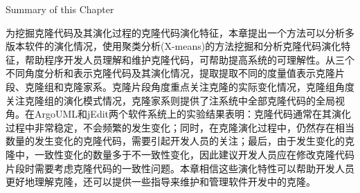 
\newpage

{Summary of  this Chapter}
 
为挖掘克隆代码及其演化过程的克隆代码演化特征，本章提出一个方法可以分析多版本软件的演化情况，使用聚类分析(X-means)的方法挖掘和分析克隆代码演化特征，帮助程序开发人员理解和维护克隆代码，可帮助提高系统的可理解性。从三个不同角度分析和表示克隆代码及其演化情况，提取提取不同的度量值表示克隆片段、克隆组和克隆家系。克隆片段角度重点关注克隆的实际变化情况，克隆组角度关注克隆组的演化模式情况，克隆家系则提供了注系统中全部克隆代码的全局视角。在ArgoUML和jEdit两个软件系统上的实验结果表明：克隆代码通常在其演化过程中非常稳定，不会频繁的发生变化；同时，在克隆演化过程中，仍然存在相当数量的发生变化的克隆代码，需要引起开发人员的关注；最后，由于发生变化的克隆中，一致性变化的数量多于不一致性变化，因此建议开发人员应在修改克隆代码片段时需要考虑克隆代码的一致性问题。本章相信这些演化特性可以帮助开发人员更好地理解克隆，还可以提供一些指导来维护和管理软件开发中的克隆。


